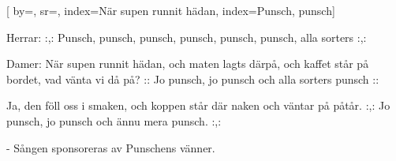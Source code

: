 

[ 		%
	by={},					%
	sr={},					%
	index={När supen runnit hädan}, %
	index={Punsch, punsch}]						%
	

\beginverse*						%
Herrar:
:,: Punsch, punsch,
punsch, punsch,
punsch, punsch,
alla sorters :,:
\endverse							%

\beginverse*						%
Damer:
När supen runnit hädan,
och maten lagts därpå,
och kaffet står på bordet,
vad vänta vi då på?
:: Jo punsch, jo punsch
och alla sorters punsch ::
\endverse							%

\beginverse*						%
Ja, den föll oss i smaken,
och koppen står där naken
och väntar på påtår.
:,: Jo punsch, jo punsch
och ännu mera punsch. :,:
\endverse

\beginverse*						%
- Sången sponsoreras av Punschens vänner.
\endverse

\endsong							%